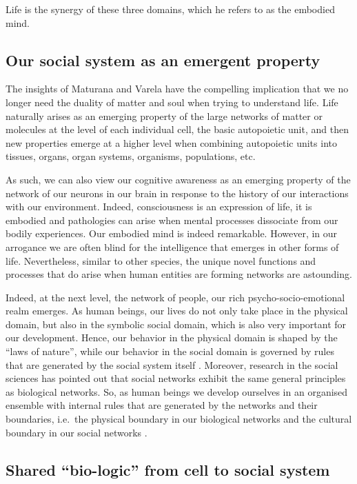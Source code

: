 \documentclass[
  11pt,
]{book}
\begin{document}
Life is the synergy of these three domains, which he refers to as the embodied mind.

\hypertarget{our-social-system-as-an-emergent-property}{%
\subsection{Our social system as an emergent property}\label{our-social-system-as-an-emergent-property}}

The insights of Maturana and Varela have the compelling implication that we no longer need the duality of matter and soul when trying to understand life. Life naturally arises as an emerging property of the large networks of matter or molecules at the level of each individual cell, the basic autopoietic unit, and then new properties emerge at a higher level when combining autopoietic units into tissues, organs, organ systems, organisms, populations, etc.

As such, we can also view our cognitive awareness as an emerging property of the network of our neurons in our brain in response to the history of our interactions with our environment. Indeed, consciousness is an expression of life, it is embodied and pathologies can arise when mental processes dissociate from our bodily experiences. Our embodied mind is indeed remarkable. However, in our arrogance we are often blind for the intelligence that emerges in other forms of life. Nevertheless, similar to other species, the unique novel functions and processes that do arise when human entities are forming networks are astounding.

Indeed, at the next level, the network of people, our rich psycho-socio-emotional realm emerges. As human beings, our lives do not only take place in the physical domain, but also in the symbolic social domain, which is also very important for our development. Hence, our behavior in the physical domain is shaped by the ``laws of nature'', while our behavior in the social domain is governed by rules that are generated by the social system itself \citep{capraLuisi2014}. Moreover, research in the social sciences has pointed out that social networks exhibit the same general principles as biological networks. So, as human beings we develop ourselves in an organised ensemble with internal rules that are generated by the networks and their boundaries, i.e.~the physical boundary in our biological networks and the cultural boundary in our social networks \citep{capraLuisi2014}.

\hypertarget{shared-bio-logic-from-cell-to-social-system}{%
\subsection{Shared ``bio-logic'' from cell to social system}\label{shared-bio-logic-from-cell-to-social-system}}
\end{document}
